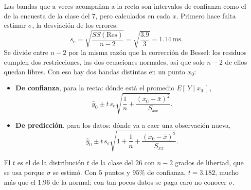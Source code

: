 \documentclass[11pt,letterpaper]{article}
\begin{document}
Las bandas que a veces acompañan a la recta son intervalos de confianza
como el de la encuesta de la clase del $7$, pero calculados en cada
$x$. Primero hace falta estimar $\sigma$, la desviación de los errores:
\[
    s_e = \sqrt{\frac{SS(\mathrm{Res})}{n - 2}}
        = \sqrt{\frac{3.9}{3}} = 1.14 \ \text{ms} .
\]
Se divide entre $n - 2$ por la misma razón que la corrección de Bessel:
los residuos cumplen dos restricciones, las dos ecuaciones normales,
así que solo $n - 2$ de ellos quedan libres. Con eso hay dos bandas
distintas en un punto $x_0$:
\begin{itemize}[itemsep=0.3em]
    \item \textbf{De confianza}, para la recta: dónde está el promedio
          $E[\,Y \mid x_0\,]$,
          \[
              \hat{y}_0 \pm t\, s_e \sqrt{\frac{1}{n}
                  + \frac{(x_0 - \bar{x})^2}{S_{xx}}} .
          \]
    \item \textbf{De predicción}, para los datos: dónde va a caer una
          observación nueva,
          \[
              \hat{y}_0 \pm t\, s_e \sqrt{1 + \frac{1}{n}
                  + \frac{(x_0 - \bar{x})^2}{S_{xx}}} .
          \]
\end{itemize}
El $t$ es el de la distribución $t$ de la clase del $26$ con $n - 2$
grados de libertad, que se usa porque $\sigma$ se estimó. Con $5$
puntos y $95\%$ de confianza, $t = 3.182$, mucho más que el $1.96$ de
la normal: con tan pocos datos se paga caro no conocer $\sigma$.
\end{document}

